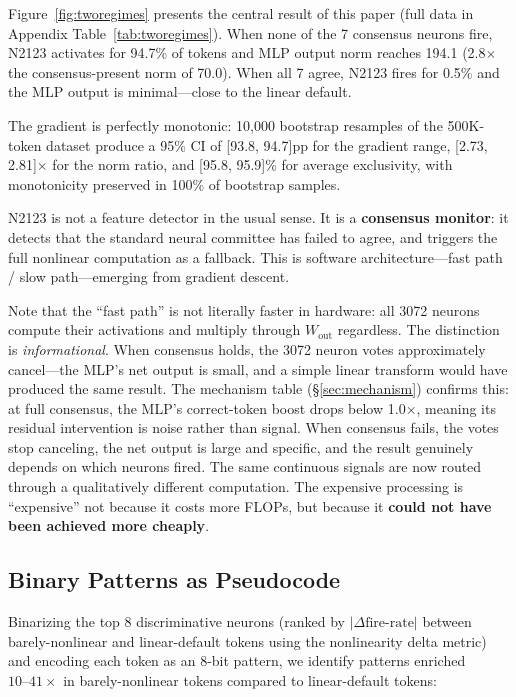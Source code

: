 \documentclass{article}
\begin{document}
Figure~\ref{fig:tworegimes} presents the central result of this paper
(full data in Appendix Table~\ref{tab:tworegimes}). When none of the 7 consensus
neurons fire, N2123 activates for 94.7\% of tokens and MLP output norm reaches 194.1 (2.8$\times$
the consensus-present norm of 70.0). When all 7 agree, N2123 fires for 0.5\% and the MLP output
is minimal---close to the linear default.

The gradient is perfectly monotonic: 10{,}000 bootstrap resamples of the 500K-token
dataset produce a 95\% CI of [93.8, 94.7]pp for the gradient range, [2.73, 2.81]$\times$
for the norm ratio, and [95.8, 95.9]\% for average exclusivity, with monotonicity
preserved in 100\% of bootstrap samples.

N2123 is not a feature detector in the usual sense. It is a
\textbf{consensus monitor}: it detects that the standard neural committee has failed to agree, and
triggers the full nonlinear computation as a fallback. This is software architecture---fast path /
slow path---emerging from gradient descent.

Note that the ``fast path'' is not literally faster in hardware: all 3072 neurons compute their
activations and multiply through $W_{\text{out}}$ regardless. The distinction is
\emph{informational}. When consensus holds, the 3072 neuron votes approximately cancel---the
MLP's net output is small, and a simple linear transform would have produced the same
result. The mechanism table (\S\ref{sec:mechanism}) confirms this: at full consensus,
the MLP's correct-token boost drops below 1.0$\times$, meaning its residual intervention
is noise rather than signal. When consensus fails, the votes stop canceling,
the net output is large and specific, and the result genuinely depends on which neurons fired.
The same continuous signals are now routed through a qualitatively different computation.
The expensive processing is ``expensive'' not because it costs more FLOPs, but because it
\textbf{could not have been achieved more cheaply}.

\subsection{Binary Patterns as Pseudocode}

Binarizing the top 8 discriminative neurons (ranked by $|\Delta\text{fire-rate}|$ between
barely-nonlinear and linear-default tokens using the nonlinearity delta metric) and encoding
each token as an 8-bit pattern, we identify patterns enriched $10\text{--}41\times$ in
barely-nonlinear tokens compared to linear-default tokens:
\end{document}
